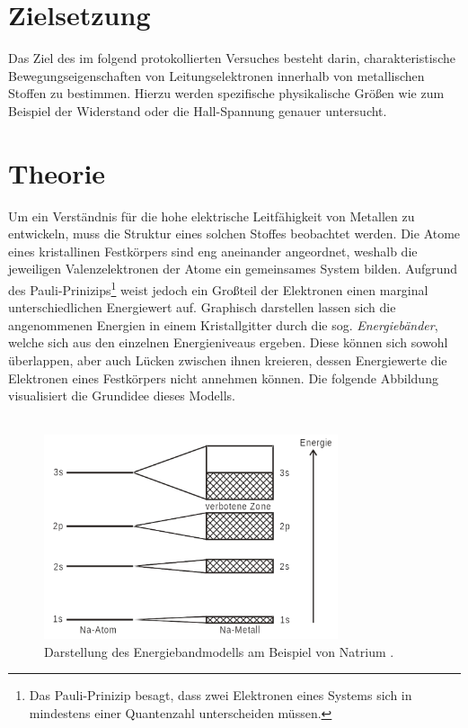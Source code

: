 


\section{Zielsetzung}

Das Ziel des im folgend protokollierten Versuches besteht darin, charakteristische Bewegungseigenschaften
von Leitungselektronen innerhalb von metallischen Stoffen zu bestimmen. Hierzu werden spezifische physikalische
Größen wie zum Beispiel der Widerstand oder die Hall-Spannung genauer untersucht.

\section{Theorie}
\label{sec:Theorie}

Um ein Verständnis für die hohe elektrische Leitfähigkeit von Metallen zu entwickeln, muss die Struktur eines solchen 
Stoffes beobachtet werden. Die Atome eines kristallinen Festkörpers sind eng aneinander angeordnet, weshalb die jeweiligen
Valenzelektronen der Atome ein gemeinsames System bilden. Aufgrund des Pauli-Prinizips\footnote{Das Pauli-Prinizip besagt, 
dass zwei Elektronen eines Systems sich in mindestens einer Quantenzahl unterscheiden müssen.} weist jedoch ein Großteil 
der Elektronen einen marginal unterschiedlichen Energiewert auf. Graphisch darstellen lassen sich die angenommenen Energien 
in einem Kristallgitter durch die sog. \emph{Energiebänder}, welche sich aus den einzelnen Energieniveaus ergeben. Diese 
können sich sowohl überlappen, aber auch Lücken zwischen ihnen kreieren, dessen Energiewerte die Elektronen eines Festkörpers 
nicht annehmen können. Die folgende Abbildung visualisiert die Grundidee dieses Modells.\\\\

\begin{figure}[H]
    \centering
    \includegraphics[height=6cm]{Energiebandmodell.png}
    \caption{Darstellung des Energiebandmodells am Beispiel von Natrium \cite{Versuchsanleitung_v511}.}
    \label{fig:Energiebandmodell}
\end{figure}

